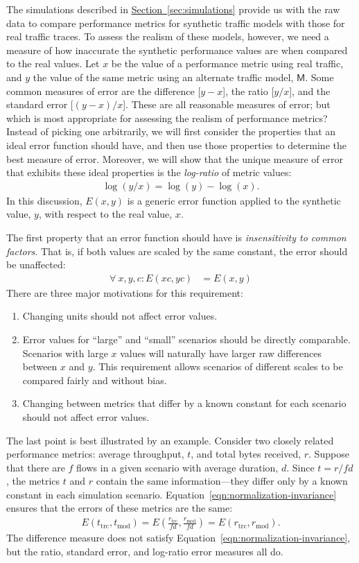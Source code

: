\documentclass[twocolumn,final]{svjour3}
\newcommand{\Section}[1]{\hyperref[sec:#1]{Section~\ref*{sec:#1}}}
\newcommand{\M}{\mathsf{M}}
\begin{document}
The simulations described in \Section{simulations} provide us with the raw data to compare performance metrics for synthetic traffic models with those for real traffic traces. To assess the realism of these models, however, we need a measure of how inaccurate the synthetic performance values are when compared to the real values. Let $x$ be the value of a performance metric using real traffic, and $y$ the value of the same metric using an alternate traffic model, $\M$. Some common measures of error are the difference [$y-x$], the ratio [$y/x$], and the standard error [$(y-x)/x$]. These are all reasonable measures of error; but which is most appropriate for assessing the realism of performance metrics? Instead of picking one arbitrarily, we will first consider the properties that an ideal error function should have, and then use those properties to determine the best measure of error. Moreover, we will show that the unique measure of error that exhibits these ideal properties is the  \textit{log-ratio} of metric values:
\begin{align}
\log(y/x)=\log(y)-\log(x).
\end{align}
In this discussion, $E(x,y)$ is a generic error function applied to the synthetic value, $y$, with respect to the real value, $x$.

The first property that an error function should have is  \textit{insensitivity to common factors}. That is, if both values are scaled by the same constant, the error should be unaffected:
\begin{align}
\label{eqn:normalization-invariance}
\forall\: x,y,c: E(x c,y c) &= E(x,y)
\end{align}
There are three major motivations for this requirement:
\begin{enumerate}
\item Changing units should not affect error values.
\item Error values for ``large'' and ``small'' scenarios should be directly comparable. Scenarios with large $x$ values will naturally have larger raw differences between $x$ and $y$. This requirement allows scenarios of different scales to be compared fairly and without bias.
\item Changing between metrics that differ by a known constant for each scenario should not affect error values.
\end{enumerate}
The last point is best illustrated by an example. Consider two closely related performance metrics: average throughput, $t$, and total bytes received, $r$. Suppose that there are $f$ flows in a given scenario with average duration, $d$. Since $t =r/fd$, the metrics $t$ and $r$ contain the same information---they differ only by a known constant in each simulation scenario. Equation~\ref{eqn:normalization-invariance} ensures that the errors of these metrics are the same:
\begin{align}
E(t_{\text{trc}},t_{\text{mod}})
	= E\left({\frac{r_{\text{trc}}}{fd},\frac{r_{\text{mod}}}{fd}}\right)
	= E(r_{\text{trc}},r_{\text{mod}}).
\end{align}
The difference measure does not satisfy Equation~\ref{eqn:normalization-invariance}, but the ratio, standard error, and log-ratio error measures all do.
\end{document}
